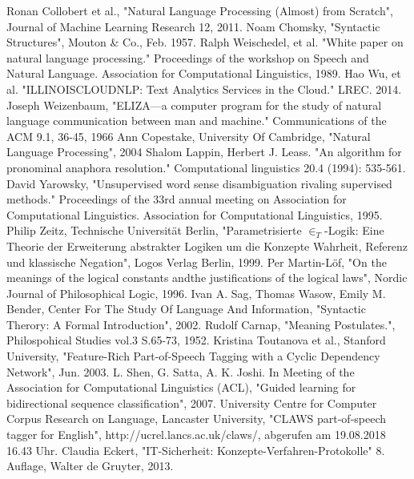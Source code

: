 \documentclass[12pt]{report}
\begin{document}
\newpage
\begin{thebibliography}{20}
Ronan Collobert et al., "Natural Language Processing (Almost) from Scratch", Journal of Machine Learning Research 12, 2011. 
 Noam Chomsky, "Syntactic Structures", Mouton \& Co., Feb. 1957.
Ralph Weischedel, et al. "White paper on natural language processing." Proceedings of the workshop on Speech and Natural Language. Association for Computational Linguistics, 1989.
Hao Wu, et al. "ILLINOISCLOUDNLP: Text Analytics Services in the Cloud." LREC. 2014.
Joseph Weizenbaum, "ELIZA—a computer program for the study of natural language communication between man and machine." Communications of the ACM 9.1, 36-45, 1966
Ann Copestake, University Of Cambridge, "Natural Language Processing", 2004
 Shalom Lappin, Herbert J. Leass. "An algorithm for pronominal anaphora resolution." Computational linguistics 20.4 (1994): 535-561.
David Yarowsky, "Unsupervised word sense disambiguation rivaling supervised methods." Proceedings of the 33rd annual meeting on Association for Computational Linguistics. Association for Computational Linguistics, 1995.
Philip Zeitz, Technische Universität Berlin, "Parametrisierte $\in_T$-Logik: Eine Theorie der Erweiterung abstrakter Logiken um die Konzepte Wahrheit, Referenz und klassische Negation", Logos Verlag Berlin, 1999.
Per Martin-Löf, "On the meanings of the logical constants andthe justifications of the logical laws", Nordic Journal of Philosophical Logic, 1996.
Ivan A. Sag, Thomas Wasow, Emily M. Bender, Center For The Study Of Language And Information, "Syntactic Therory: A Formal Introduction", 2002.
Rudolf Carnap, "Meaning Postulates.", Philospohical Studies vol.3 S.65-73, 1952.
Kristina Toutanova et al., Stanford University, "Feature-Rich Part-of-Speech Tagging with a Cyclic Dependency Network", Jun. 2003.
 L. Shen, G. Satta, A. K. Joshi. In Meeting of the Association for Computational Linguistics (ACL), "Guided learning for bidirectional sequence classification", 2007.
University Centre for Computer Corpus Research on Language, Lancaster University, "CLAWS part-of-speech tagger for English", http://ucrel.lancs.ac.uk/claws/, abgerufen am 19.08.2018 16.43 Uhr.
Claudia Eckert, "IT-Sicherheit: Konzepte-Verfahren-Protokolle" 8. Auflage, Walter de Gruyter, 2013.

\end{thebibliography}
\end{document}
